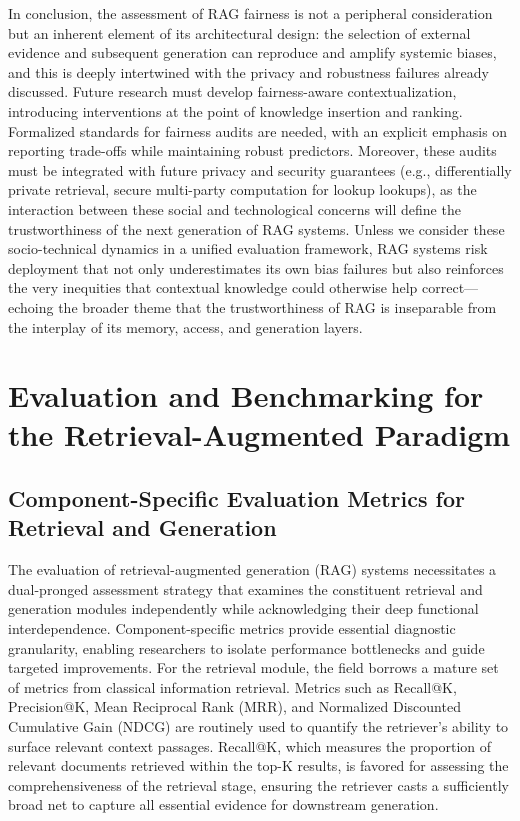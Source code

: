 \documentclass[11pt,a4paper]{article}
\begin{document}
In conclusion, the assessment of RAG fairness is not a peripheral consideration but an inherent element of its architectural design: the selection of external evidence and subsequent generation can reproduce and amplify systemic biases, and this is deeply intertwined with the privacy and robustness failures already discussed. Future research must develop fairness-aware contextualization, introducing interventions at the point of knowledge insertion and ranking. Formalized standards for fairness audits are needed, with an explicit emphasis on reporting trade-offs while maintaining robust predictors. Moreover, these audits must be integrated with future privacy and security guarantees (e.g., differentially private retrieval, secure multi-party computation for lookup lookups), as the interaction between these social and technological concerns will define the trustworthiness of the next generation of RAG systems. Unless we consider these socio-technical dynamics in a unified evaluation framework, RAG systems risk deployment that not only underestimates its own bias failures but also reinforces the very inequities that contextual knowledge could otherwise help correct---echoing the broader theme that the trustworthiness of RAG is inseparable from the interplay of its memory, access, and generation layers.


\section{Evaluation and Benchmarking for the Retrieval-Augmented Paradigm}



\subsection{Component-Specific Evaluation Metrics for Retrieval and Generation}


The evaluation of retrieval-augmented generation (RAG) systems necessitates a dual-pronged assessment strategy that examines the constituent retrieval and generation modules independently while acknowledging their deep functional interdependence. Component-specific metrics provide essential diagnostic granularity, enabling researchers to isolate performance bottlenecks and guide targeted improvements. For the retrieval module, the field borrows a mature set of metrics from classical information retrieval. Metrics such as Recall@K, Precision@K, Mean Reciprocal Rank (MRR), and Normalized Discounted Cumulative Gain (NDCG) are routinely used to quantify the retriever's ability to surface relevant context passages. Recall@K, which measures the proportion of relevant documents retrieved within the top-K results, is favored for assessing the comprehensiveness of the retrieval stage, ensuring the retriever casts a sufficiently broad net to capture all essential evidence for downstream generation.
\end{document}

